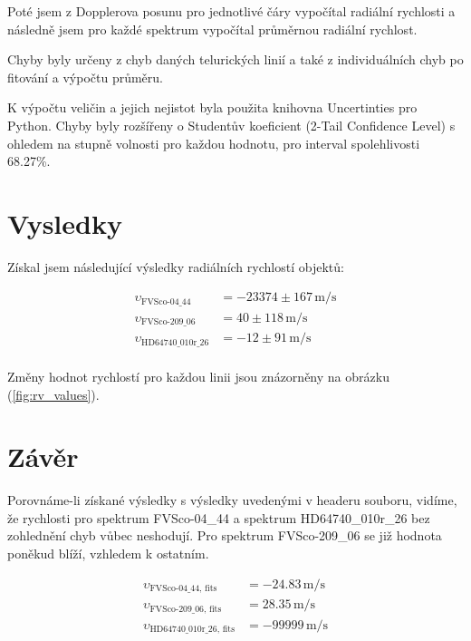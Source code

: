 \documentclass[a4paper,11pt,twocolumn]{article}
\begin{document}
        Poté jsem z Dopplerova posunu pro jednotlivé čáry vypočítal radiální rychlosti a následně jsem pro každé spektrum vypočítal průměrnou radiální rychlost.

        Chyby byly určeny z chyb daných telurických linií a také z individuálních chyb po fitování a výpočtu průměru. 

        K výpočtu veličin a jejich nejistot byla použita knihovna Uncertinties pro Python. Chyby byly rozšířeny o Studentův koeficient (2-Tail Confidence Level) s ohledem na stupně volnosti pro každou hodnotu, pro interval spolehlivosti 68.27\%.

    \section{Vysledky}
        Získal jsem následující výsledky radiálních rychlostí objektů: 

        \begin{equation*}
            \begin{split}
                \upsilon_{\text{FVSco-04\_44}} &= -23374 \pm 167 \, \si{\meter\per\second} \\
                \upsilon_{\text{FVSco-209\_06}} &= 40 \pm 118 \, \si{\meter\per\second} \\
                \upsilon_{\text{HD64740\_010r\_26}} &= -12 \pm 91 \, \si{\meter\per\second} \\
            \end{split}
        \end{equation*}

        Změny hodnot rychlostí pro každou linii jsou znázorněny na obrázku (\ref{fig:rv_values}).

        
    \section{Závěr}
        Porovnáme-li získané výsledky s výsledky uvedenými v headeru souboru, vidíme, že rychlosti pro spektrum FVSco-04\_44 a spektrum HD64740\_010r\_26 bez zohlednění chyb vůbec neshodují. Pro spektrum FVSco-209\_06 se již hodnota poněkud blíží, vzhledem k ostatním.
        
        \begin{equation*}
            \begin{split}
                \upsilon_{\text{FVSco-04\_44, fits}} &= -24.83 \, \si{\meter\per\second} \\
                \upsilon_{\text{FVSco-209\_06, fits}} &= 28.35 \, \si{\meter\per\second} \\
                \upsilon_{\text{HD64740\_010r\_26, fits}} &= -99999 \, \si{\meter\per\second} \\
            \end{split}
        \end{equation*}
\end{document}
